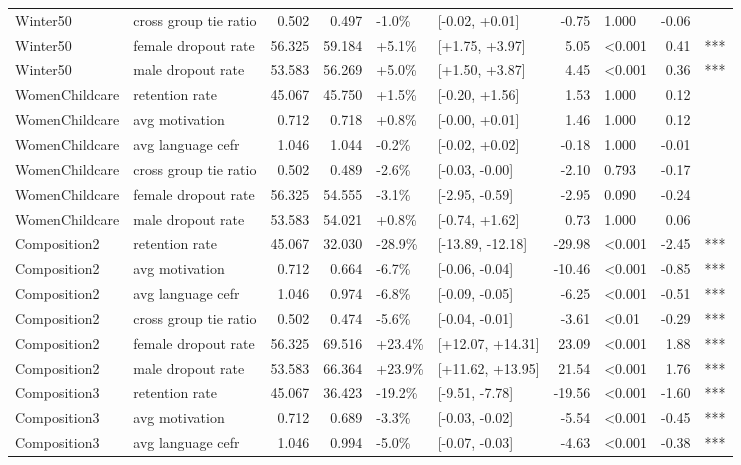 \begin{longtable}[t]{llrrllrlrl}
Winter50 & cross group tie ratio & 0.502 & 0.497 & -1.0\% & {}[-0.02, +0.01] & -0.75 & 1.000 & -0.06 & \\
Winter50 & female dropout rate & 56.325 & 59.184 & +5.1\% & {}[+1.75, +3.97] & 5.05 & <0.001 & 0.41 & ***\\
Winter50 & male dropout rate & 53.583 & 56.269 & +5.0\% & {}[+1.50, +3.87] & 4.45 & <0.001 & 0.36 & ***\\
WomenChildcare & retention rate & 45.067 & 45.750 & +1.5\% & {}[-0.20, +1.56] & 1.53 & 1.000 & 0.12 & \\
\addlinespace
WomenChildcare & avg motivation & 0.712 & 0.718 & +0.8\% & {}[-0.00, +0.01] & 1.46 & 1.000 & 0.12 & \\
WomenChildcare & avg language cefr & 1.046 & 1.044 & -0.2\% & {}[-0.02, +0.02] & -0.18 & 1.000 & -0.01 & \\
WomenChildcare & cross group tie ratio & 0.502 & 0.489 & -2.6\% & {}[-0.03, -0.00] & -2.10 & 0.793 & -0.17 & \\
WomenChildcare & female dropout rate & 56.325 & 54.555 & -3.1\% & {}[-2.95, -0.59] & -2.95 & 0.090 & -0.24 & \\
WomenChildcare & male dropout rate & 53.583 & 54.021 & +0.8\% & {}[-0.74, +1.62] & 0.73 & 1.000 & 0.06 & \\
\addlinespace
Composition2 & retention rate & 45.067 & 32.030 & -28.9\% & {}[-13.89, -12.18] & -29.98 & <0.001 & -2.45 & ***\\
Composition2 & avg motivation & 0.712 & 0.664 & -6.7\% & {}[-0.06, -0.04] & -10.46 & <0.001 & -0.85 & ***\\
Composition2 & avg language cefr & 1.046 & 0.974 & -6.8\% & {}[-0.09, -0.05] & -6.25 & <0.001 & -0.51 & ***\\
Composition2 & cross group tie ratio & 0.502 & 0.474 & -5.6\% & {}[-0.04, -0.01] & -3.61 & <0.01 & -0.29 & ***\\
Composition2 & female dropout rate & 56.325 & 69.516 & +23.4\% & {}[+12.07, +14.31] & 23.09 & <0.001 & 1.88 & ***\\
\addlinespace
Composition2 & male dropout rate & 53.583 & 66.364 & +23.9\% & {}[+11.62, +13.95] & 21.54 & <0.001 & 1.76 & ***\\
Composition3 & retention rate & 45.067 & 36.423 & -19.2\% & {}[-9.51, -7.78] & -19.56 & <0.001 & -1.60 & ***\\
Composition3 & avg motivation & 0.712 & 0.689 & -3.3\% & {}[-0.03, -0.02] & -5.54 & <0.001 & -0.45 & ***\\
Composition3 & avg language cefr & 1.046 & 0.994 & -5.0\% & {}[-0.07, -0.03] & -4.63 & <0.001 & -0.38 & ***\\

\end{longtable}
